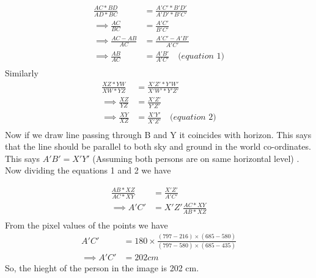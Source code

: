 \documentclass[a4paper]{article}
\begin{document}
\begin{equation*} 
\begin{split}
 \frac{AC*BD}{AD*BC} &= \frac{A'C'*B'D'}{A'D'*B'C'} \\
\implies  \frac{AC}{BC} &=  \frac{A'C'}{B'C'} \\
\implies  \frac{AC-AB}{AC} &=  \frac{A'C'-A'B'}{A'C'} \\
\implies \frac{AB}{AC} &=  \frac{A'B'}{A'C'} \quad \textit{(equation 1)} \\
 \end{split}
\end{equation*}
Similarly
\begin{equation*} 
\begin{split}
 \frac{XZ*YW}{XW*YZ} &= \frac{X'Z'*Y'W'}{X'W'*Y'Z'} \\
\implies  \frac{XZ}{YZ} &=  \frac{X'Z'}{Y'Z'} \\
\implies  \frac{XY}{XZ} &=  \frac{X'Y'}{X'Z'} \quad \textit{(equation 2)}\\
 \end{split}
\end{equation*}
Now if we draw line passing through B and Y it coincides with horizon. This says that the line should be parallel to both sky and ground in the world co-ordinates. This says $ A'B' = X'Y' $ (Assuming both persons are on same horizontal level) . Now dividing the equations 1 and 2 we have
 
\begin{equation*}
\begin{split}
\frac{AB*XZ}{AC*XY} &= \frac{X'Z'}{A'C'} \\
\implies A'C' &= X'Z' \frac{AC*XY}{AB*XZ} \\
\end{split}
\end{equation*}
From the pixel values of the points we have  
\begin{equation*}
\begin{split}
A'C' &= 180\times\frac{(797-216)\times(685-580)}{(797-580)\times(685-435)} \\
\implies A'C' &= 202 cm
\end{split}
\end{equation*}
So, the hieght of the person in the image is 202 cm.


\hrulefill \\
\end{document}
